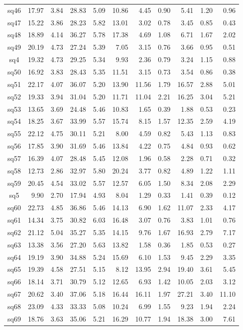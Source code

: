 {\begin{longtable}{@{}cr@{\hspace{1em}}r@{\hspace{1em}}r@{\hspace{1em}}r@{\hspace{1em}}r@{\hspace{2em}}r@{\hspace{1em}}r@{\hspace{1em}}r@{\hspace{1em}}r@{\hspace{1em}}r@{}}
sq46&17.97&3.84&28.83&5.09&10.86&4.45&0.90&5.41&1.20&0.96\\
sq47&15.22&3.86&28.23&5.82&13.01&3.02&0.78&3.45&0.85&0.43\\
sq48&18.89&4.14&36.27&5.78&17.38&4.69&1.08&6.71&1.67&2.02\\
sq49&20.19&4.73&27.24&5.39&7.05&3.15&0.76&3.66&0.95&0.51\\
sq4&19.32&4.73&29.25&5.34&9.93&2.36&0.79&3.24&1.15&0.88\\
sq50&16.92&3.83&28.43&5.35&11.51&3.15&0.73&3.54&0.86&0.38\\
sq51&22.17&4.07&36.07&5.20&13.90&11.56&1.79&16.57&2.88&5.01\\
sq52&19.33&3.94&31.04&5.20&11.71&11.04&2.21&16.25&3.04&5.21\\
sq53&13.65&3.69&24.48&5.46&10.83&1.65&0.39&1.88&0.53&0.23\\
sq54&18.25&3.67&33.99&5.57&15.74&8.15&1.57&12.35&2.59&4.19\\
sq55&22.12&4.75&30.11&5.21&8.00&4.59&0.82&5.43&1.13&0.83\\
sq56&17.85&3.90&31.69&5.46&13.84&4.22&0.75&4.84&0.93&0.62\\
sq57&16.39&4.07&28.48&5.45&12.08&1.96&0.58&2.28&0.71&0.32\\
sq58&12.73&2.86&32.97&5.80&20.24&3.77&0.82&4.89&1.22&1.11\\
sq59&20.45&4.54&33.02&5.57&12.57&6.05&1.50&8.34&2.08&2.29\\
sq5&9.90&2.70&17.94&4.93&8.04&1.29&0.33&1.41&0.39&0.12\\
sq60&22.73&4.85&36.86&5.46&14.13&6.90&1.62&11.07&2.33&4.17\\
sq61&14.34&3.75&30.82&6.03&16.48&3.07&0.76&3.83&1.01&0.76\\
sq62&21.12&5.04&35.27&5.35&14.15&9.76&1.67&16.93&2.79&7.17\\
sq63&13.38&3.56&27.20&5.63&13.82&1.58&0.36&1.85&0.53&0.27\\
sq64&19.19&3.90&34.88&5.24&15.69&6.10&1.53&9.45&2.29&3.35\\
sq65&19.39&4.58&27.51&5.15&8.12&13.95&2.94&19.40&3.61&5.45\\
sq66&18.14&3.71&30.79&5.12&12.65&6.93&1.42&10.05&2.03&3.12\\
sq67&20.62&3.40&37.06&5.18&16.44&16.11&1.97&27.21&3.40&11.10\\
sq68&23.09&4.33&33.33&5.08&10.24&6.99&1.55&9.23&1.94&2.24\\
sq69&18.76&3.63&35.06&5.21&16.29&10.77&1.94&18.38&3.00&7.61\\

\end{longtable}}
